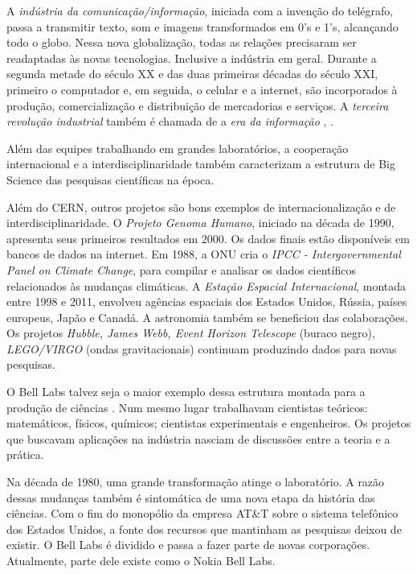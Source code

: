 \documentclass{hipatia}
\begin{document}
	A \textit{indústria da comunicação/informação}, iniciada com a invenção do telégrafo, passa a transmitir texto, som e imagens transformados em 0’s e 1’s, alcançando todo o globo. Nessa nova globalização, todas as relações precisaram ser readaptadas às novas tecnologias. Inclusive a indústria em geral. Durante a segunda metade do século XX e das duas primeiras décadas do século XXI, primeiro o computador e, em seguida, o celular e a internet, são incorporados à produção, comercialização e distribuição de mercadorias e serviços. A \textit{terceira revolução industrial} também é chamada de a \textit{era da informação} 	\cite{Briggs2016}, 	\cite{Castells1999}.

Além das equipes trabalhando em grandes laboratórios, a cooperação internacional e a interdisciplinaridade também caracterizam a estrutura de Big Science das pesquisas científicas na época.

Além do CERN, outros projetos são bons exemplos de internacionalização e de interdisciplinaridade. O \textit{Projeto Genoma Humano}, iniciado na década de 1990, apresenta seus primeiros resultados em 2000. Os dados finais estão disponíveis em bancos de dados na internet. Em 1988, a ONU cria o \textit{IPCC - Intergovernmental Panel on Climate Change}, para compilar e analisar os dados científicos relacionados às mudanças climáticas. A \textit{Estação Espacial Internacional}, montada entre 1998 e 2011, envolveu agências espaciais dos Estados Unidos, Rússia, países europeus, Japão e Canadá. A astronomia também se beneficiou das colaborações. Os projetos \textit{Hubble, James Webb, Event Horizon Telescope} (buraco negro), \textit{LEGO/VIRGO} (ondas gravitacionais) continuam produzindo dados para novas pesquisas.

O Bell Labs talvez seja o maior exemplo dessa estrutura montada para a produção de ciências 	\cite{Gertner2012}. Num mesmo lugar trabalhavam cientistas teóricos: matemáticos, físicos, químicos; cientistas experimentais e engenheiros. Os projetos que buscavam aplicações na indústria nasciam de discussões entre a teoria e a prática.

Na década de 1980, uma grande transformação atinge o laboratório. A razão dessas mudanças também é sintomática de uma nova etapa da história das ciências. Com o fim do monopólio da empresa AT\&T sobre o sistema telefônico dos Estados Unidos, a fonte dos recursos que mantinham as pesquisas deixou de existir. O Bell Labs é dividido e passa a fazer parte de novas corporações. Atualmente, parte dele existe como o Nokia Bell Labs.
\end{document}
